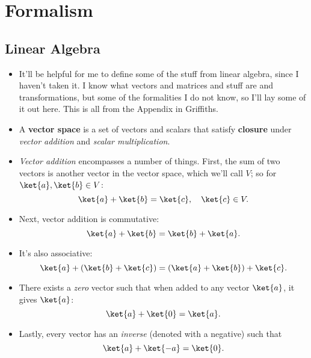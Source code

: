\section{Formalism}

\subsection*{Linear Algebra}

\begin{itemize}
    \item It'll be helpful for me to define some of the stuff from linear algebra, since I haven't taken it. I know what vectors and matrices and stuff are and transformations, but some of the formalities I do not know, so I'll lay some of it out here. This is all from the Appendix in Griffiths.
    \item A \textbf{vector space} is a set of vectors and scalars that satisfy \textbf{closure} under \textit{vector addition} and \textit{scalar multiplication}.
    \item \textit{Vector addition} encompasses a number of things. First, the sum of two vectors is another vector in the vector space, which we'll call $V$; so for $\ket{a},\ket{b} \in V$:
        \begin{equation*}
            \ket{a} + \ket{b} = \ket{c}, \quad \ket{c} \in V.
        \end{equation*}
    \item Next, vector addition is commutative:
        \begin{equation*}
            \ket{a} + \ket{b} = \ket{b} + \ket{a}.
        \end{equation*}
    \item It's also associative:
        \begin{equation*}
            \ket{a} + (\ket{b} + \ket{c}) = (\ket{a} + \ket{b}) + \ket{c}.
        \end{equation*}
    \item There exists a \textit{zero} vector such that when added to any vector $\ket{a}$, it gives $\ket{a}$:
        \begin{equation*}
            \ket{a} + \ket{0} = \ket{a}.
        \end{equation*}
    \item Lastly, every vector has an \textit{inverse} (denoted with a negative) such that
        \begin{equation*}
            \ket{a} + \ket{-a} = \ket{0}.
        \end{equation*}

\end{itemize}
